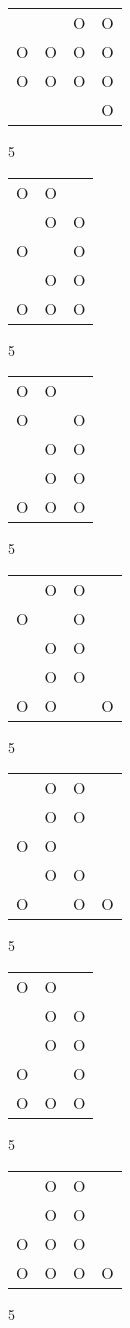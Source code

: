 \begin{tabular}{|m{0.2cm}m{0.2cm}m{0.2cm}m{0.2cm}|}\hline
 & &O&O\\
O&O&O&O\\
O&O&O&O\\
 & & &O\\
\hline\end{tabular}5
\begin{tabular}{|m{0.2cm}m{0.2cm}m{0.2cm}|}\hline
O&O& \\
 &O&O\\
O& &O\\
 &O&O\\
O&O&O\\
\hline\end{tabular}5
\begin{tabular}{|m{0.2cm}m{0.2cm}m{0.2cm}|}\hline
O&O& \\
O& &O\\
 &O&O\\
 &O&O\\
O&O&O\\
\hline\end{tabular}5
\begin{tabular}{|m{0.2cm}m{0.2cm}m{0.2cm}m{0.2cm}|}\hline
 &O&O& \\
O& &O& \\
 &O&O& \\
 &O&O& \\
O&O& &O\\
\hline\end{tabular}5
\begin{tabular}{|m{0.2cm}m{0.2cm}m{0.2cm}m{0.2cm}|}\hline
 &O&O& \\
 &O&O& \\
O&O& & \\
 &O&O& \\
O& &O&O\\
\hline\end{tabular}5
\begin{tabular}{|m{0.2cm}m{0.2cm}m{0.2cm}|}\hline
O&O& \\
 &O&O\\
 &O&O\\
O& &O\\
O&O&O\\
\hline\end{tabular}5
\begin{tabular}{|m{0.2cm}m{0.2cm}m{0.2cm}m{0.2cm}|}\hline
 &O&O& \\
 &O&O& \\
O&O&O& \\
O&O&O&O\\
\hline\end{tabular}5
